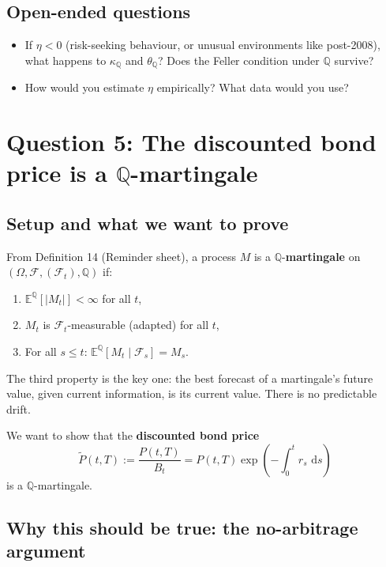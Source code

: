 \documentclass[11pt]{article}
\newcommand{\QQ}{\mathbb{Q}}
\newcommand{\EE}{\mathbb{E}}
\newcommand{\FF}{\mathcal{F}}
\newcommand{\dd}{\,\mathrm{d}}
\begin{document}
\subsection*{Open-ended questions}
\begin{itemize}
  \item If $\eta < 0$ (risk-seeking behaviour, or unusual environments like
  post-2008), what happens to $\kappa_\QQ$ and $\theta_\QQ$?  Does the
  Feller condition under $\QQ$ survive?
  \item How would you estimate $\eta$ empirically?  What data would you use?
\end{itemize}

\newpage
\section{Question 5: The discounted bond price is a $\QQ$-martingale}

\subsection{Setup and what we want to prove}

\begin{recall_box}
From Definition 14 (Reminder sheet), a process $M$ is a
$\QQ$-\textbf{martingale} on $(\Omega,\FF,(\FF_t),\QQ)$ if:
\begin{enumerate}
  \item $\EE^\QQ[|M_t|] < \infty$ for all $t$,
  \item $M_t$ is $\FF_t$-measurable (adapted) for all $t$,
  \item For all $s \le t$: $\EE^\QQ[M_t \mid \FF_s] = M_s$.
\end{enumerate}
The third property is the key one: the best forecast of a martingale's
future value, given current information, is its current value.  There is
no predictable drift.
\end{recall_box}

We want to show that the \textbf{discounted bond price}
\[
\widetilde{P}(t,T) := \frac{P(t,T)}{B_t}
= P(t,T)\exp\!\left(-\int_0^t r_s\,\dd s\right)
\]
is a $\QQ$-martingale.

\subsection{Why this should be true: the no-arbitrage argument}
\end{document}
